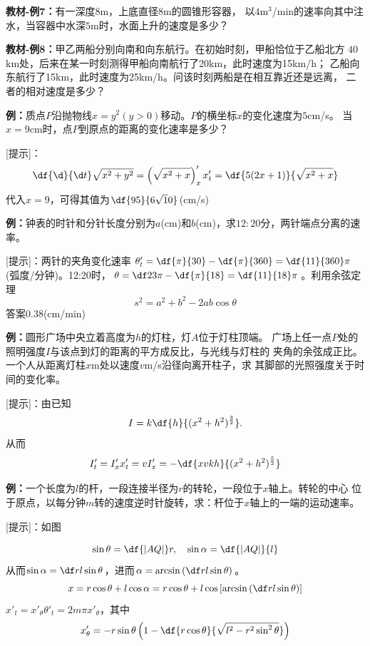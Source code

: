 {\bf 教材-例7：}有一深度$8$m，上底直径$8$m的圆锥形容器，
以$4$m$^3$/min的速率向其中注水，当容器中水深$5$m时，水面上升的速度是多少？

{\bf 教材-例8：}甲乙两船分别向南和向东航行。在初始时刻，甲船恰位于乙船北方
$40$km处，后来在某一时刻测得甲船向南航行了20km，此时速度为15km/h；
乙船向东航行了15km，此时速度为25km/h。问该时刻两船是在相互靠近还是远离，
二者的相对速度是多少？

{\bf 例：}质点$P$沿抛物线$x=y^2(y>0)$移动。$P$的横坐标$x$的变化速度为$5$cm/s。
当$x=9$cm时，点$P$到原点的距离的变化速率是多少？

[提示]：
$$\df{\d}{\d t}\sqrt{x^2+y^2}=\left(\sqrt{x^2+x}\right)'_xx'_t
=\df{5(2x+1)}{\sqrt{x^2+x}}$$
代入$x=9$，可得其值为$\df{95}{6\sqrt10}$(cm/s)

{\bf 例：}钟表的时针和分针长度分别为$a$(cm)和$b$(cm)，求$12:20$分，两针端点分离的速率。

[提示]：两针的夹角变化速率$\theta'_t=\df{\pi}{30}-\df{\pi}{360}
=\df{11}{360}\pi$(弧度/分钟)。12:20时，$\theta=\df23\pi-\df{\pi}{18}
=\df{11}{18}\pi$。利用余弦定理
$$s^2=a^2+b^2-2ab\cos\theta$$
答案$0.38$(cm/min)

{\bf 例：}圆形广场中央立着高度为$h$的灯柱，灯$A$位于灯柱顶端。
广场上任一点$P$处的照明强度$I$与该点到灯的距离的平方成反比，与光线与灯柱的
夹角的余弦成正比。一个人从距离灯柱$x$m处以速度$v$m/s沿径向离开柱子，求
其脚部的光照强度关于时间的变化率。

[提示]：由已知
$$I=k\df{h}{(x^2+h^2)^{\frac32}}.$$
从而
$$I'_t=I'_xx'_t=vI'_x=-\df{xvkh}{(x^2+h^2)^{\frac52}}$$

{\bf 例：}一个长度为$l$的杆，一段连接半径为$r$的转轮，一段位于$x$轴上。转轮的中心
位于原点，以每分钟$m$转的速度逆时针旋转，求：杆位于$x$轴上的一端的运动速率。

[提示]：如图
\begin{center}
\end{center}
$$\sin\theta=\df{|AQ|}r,\quad \sin\alpha=\df{|AQ|}{l}$$
从而$\sin\alpha=\df rl\sin\theta$，进而$\alpha=\arcsin\left(
\df rl\sin\theta\right)$。
$$x=r\cos\theta+l\cos\alpha=r\cos\theta+l\cos
\left[\arcsin\left(\df rl\sin\theta\right)\right]$$
$x'_t=x'_{\theta}\theta'_t=2m\pi x'_{\theta}$，其中
$$x'_{\theta}
=-r\sin\theta\left(1-\df{r\cos\theta}{\sqrt{l^2-r^2\sin^2\theta}}\right)$$

